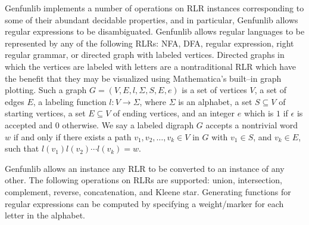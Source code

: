 \documentclass{article}
\theoremstyle{plain}
\begin{document}
Genfunlib implements a number of operations on RLR instances corresponding to
some of their abundant decidable properties, and in particular, Genfunlib allows
regular expressions to be disambiguated.
Genfunlib allows regular languages to be represented by any of the
following RLRs: NFA, DFA, regular expression, right regular grammar, or
directed graph with labeled vertices.
Directed graphs in which the vertices are labeled with letters are a
nontraditional RLR
which have the benefit that they may be visualized using Mathematica's
built--in graph plotting.
Such a graph \( G = ( V, E, l, \Sigma, S, E, e ) \) is a set of vertices \( V \), a
set of edges \( E \),
a labeling function \( l : V \rightarrow \Sigma \), where \( \Sigma \) is an
alphabet,
a set \( S \subseteq V \) of starting vertices,
a set \( E \subseteq V \) of ending vertices,
and an integer \( e \) which is \( 1 \) if \( \epsilon \) is accepted
and \( 0 \) otherwise.
We say a labeled digraph \( G \) accepts a nontrivial word \( w \) if and only
if there exists a path \( v_1, v_2, \dots, v_k \in V \)
in \( G \) with \( v_1 \in S \),
and \( v_k \in E \),
such that
\( l(v_1)l(v_2) \cdots l(v_k) = w \).

Genfunlib allows an instance any RLR to be converted to an instance of any
other.
The following operations on RLRs are
supported: union, intersection, complement, reverse, concatenation, and
Kleene star.
Generating functions for regular expressions can be computed by specifying a
weight/marker for each letter in the alphabet.
\end{document}
